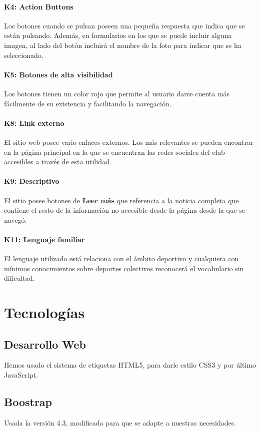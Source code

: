 \documentclass[10pt, spanish, pdftex]{template/UC3M_document}
\begin{document}
\paragraph{K4: Action Buttons}
  Los botones cuando se pulsan poseen una pequeña respuesta que indica que se están pulsando. Además, en formularios en los que se puede incluir alguna imagen, al lado del botón incluirá el nombre de la foto para indicar que se ha seleccionado.
\paragraph{K5: Botones de alta visibilidad}
  Los botones tienen un color rojo que permite al usuario darse cuenta más fácilmente de su existencia y facilitando la navegación.
\paragraph{K8: Link externo}
  El sitio web posee vario enlaces externos. Los más relevantes se pueden encontrar en la página principal en la que se encuentran las redes sociales del club accesibles a través de esta utilidad.
\paragraph{K9: Descriptivo}
  El sitio posee botones de \textbf{Leer más} que referencia a la noticia completa que contiene el resto de la información no accesible desde la página desde la que se navegó.
\paragraph{K11: Lenguaje familiar}
  El lenguaje utilizado está relaciona con el ámbito deportivo y cualquiera con mínimos conocimientos sobre deportes colectivos reconocerá el vocabulario sin dificultad.



\newpage

\section{Tecnologías}
\subsection{Desarrollo Web}
Hemos usado el sistema de etiquetas HTML5, para darle estilo CSS3 y por último JavaScript.
\subsection{Boostrap}
Usada la versión 4.3, modificada para que se adapte a nuestras necesidades.
\end{document}
